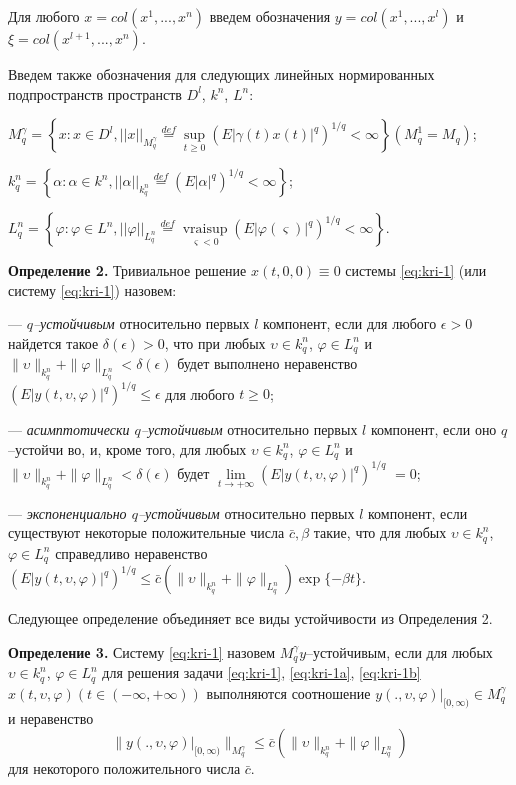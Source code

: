 Для любого $x = col (x^1, ..., x^n)$ введем обозначения $y =  col
(x^1, ..., x^l)$ и $\xi = col (x^{l+1                   }, ...,
x^n)$.

Введем также обозначения для следующих линейных нормированных
подпространств пространств $D^l$, $k^n$, $L^n$:

$ M_q^{\gamma } = \left \{x: x \in D^l, ||x||_{M_q^\gamma }
 \mathrel
 {\mathop {=} \limits ^{def}} \mathrel {\mathop {\sup}
 \limits _{t
 \ge 0}} (E|\gamma (t)x(t)|^q)^{1/q} < \infty \right \}  (
 M_q^1 = M_q)$;

$ k_q^n = \left \{\alpha: \alpha \in k^n, ||\alpha ||_{k_q^n}
 \mathrel
 {\mathop {=} \limits ^{def}} (E|\alpha |^q)^{1/q} < \infty
 \right  \}$;

 $L_q^n = \left \{\varphi: \varphi \in L^n,
 ||\varphi||_{L_q^n}
 \mathrel {\mathop {=} \limits ^{def}} \mathrel {\mathop
 {vrai \sup}
 \limits _{\varsigma < 0}}(E|\varphi (\varsigma ) |^q)^{1/q} < \infty
 \right \}$.


\textbf {Определение 2.}  Тривиальное решение $x(t,0, 0)\equiv 0$
системы \eqref{eq:kri-1} (или систему \eqref{eq:kri-1}) назовем:

---  {\it $q$--устойчивым} относительно первых $l$ компонент, если
для любого $\epsilon > 0$ найдется такое $\delta (\epsilon) > 0$,
что при любых $\upsilon \in k^n_q$, $\varphi \in L^n_q$ и
$\|\upsilon\|_{k^n_q} + \|\varphi \|_{L^n_q} < \delta (\epsilon)$
будет выполнено неравенство $(E|y(t,\upsilon, \varphi)|^q)^{1/q} \le
\epsilon $ для любого $t \ge 0$;

---  {\it асимптотически $q$--устойчивым }относительно первых $l$ компонент, если
оно $q$--устойчи\- во, и, кроме того, для любых $\upsilon \in
k^n_q$, $\varphi \in L^n_q$ и $\|\upsilon\|_{k^n_q} + \|\varphi
\|_{L^n_q} < \delta (\epsilon)$ будет $\lim \limits_{t  \rightarrow
+\infty }(E|y(t,\upsilon, \varphi)|^q)^{1/q}$ $ = 0$;

---  {\it экспоненциально $q$--устойчивым }относительно первых $l$ компонент, если
существуют некоторые положительные числа $\bar c, \beta$ такие, что
для любых $\upsilon \in k^n_q$, $\varphi \in L^n_q$ справедливо
неравенство $(E|y(t,\upsilon, \varphi)|^q)^{1/q} \le \bar
c\left(\|\upsilon\|_{k^n_q} + \|\varphi \|_{L^n_q}\right )\exp
\{-\beta t\}$.

Следующее определение объединяет все виды устойчивости из
Определения 2.

\textbf {Определение 3.}  Систему \eqref{eq:kri-1} назовем  $M_q^\gamma y
$--устойчивым, если для любых $\upsilon \in k^n_q$, $\varphi \in
L^n_q$ для решения задачи \eqref{eq:kri-1}, \eqref{eq:kri-1a}, \eqref{eq:kri-1b}   $x(t,\upsilon,
\varphi)(t \in (-\infty, +\infty))$ выполняются  соотношение $y(.,
\upsilon, \varphi)|_{[0,\infty)} \in M_q^\gamma$ и неравенство
\begin{equation}
    \label{eq:kri-2}
    \|y(., \upsilon, \varphi)|_{[0,\infty)}\|_{M_q^\gamma} \le \bar c\left(\|\upsilon\|_{k^n_q} +
    \|\varphi \|_{L^n_q}\right)
\end{equation}
для некоторого положительного числа $\bar c$.

